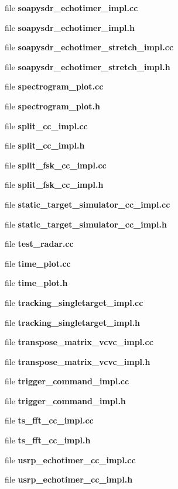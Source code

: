 \begin{DoxyCompactItemize}
\item 
file {\bf soapysdr\+\_\+echotimer\+\_\+impl.\+cc}
\item 
file {\bf soapysdr\+\_\+echotimer\+\_\+impl.\+h}
\item 
file {\bf soapysdr\+\_\+echotimer\+\_\+stretch\+\_\+impl.\+cc}
\item 
file {\bf soapysdr\+\_\+echotimer\+\_\+stretch\+\_\+impl.\+h}
\item 
file {\bf spectrogram\+\_\+plot.\+cc}
\item 
file {\bf spectrogram\+\_\+plot.\+h}
\item 
file {\bf split\+\_\+cc\+\_\+impl.\+cc}
\item 
file {\bf split\+\_\+cc\+\_\+impl.\+h}
\item 
file {\bf split\+\_\+fsk\+\_\+cc\+\_\+impl.\+cc}
\item 
file {\bf split\+\_\+fsk\+\_\+cc\+\_\+impl.\+h}
\item 
file {\bf static\+\_\+target\+\_\+simulator\+\_\+cc\+\_\+impl.\+cc}
\item 
file {\bf static\+\_\+target\+\_\+simulator\+\_\+cc\+\_\+impl.\+h}
\item 
file {\bf test\+\_\+radar.\+cc}
\item 
file {\bf time\+\_\+plot.\+cc}
\item 
file {\bf time\+\_\+plot.\+h}
\item 
file {\bf tracking\+\_\+singletarget\+\_\+impl.\+cc}
\item 
file {\bf tracking\+\_\+singletarget\+\_\+impl.\+h}
\item 
file {\bf transpose\+\_\+matrix\+\_\+vcvc\+\_\+impl.\+cc}
\item 
file {\bf transpose\+\_\+matrix\+\_\+vcvc\+\_\+impl.\+h}
\item 
file {\bf trigger\+\_\+command\+\_\+impl.\+cc}
\item 
file {\bf trigger\+\_\+command\+\_\+impl.\+h}
\item 
file {\bf ts\+\_\+fft\+\_\+cc\+\_\+impl.\+cc}
\item 
file {\bf ts\+\_\+fft\+\_\+cc\+\_\+impl.\+h}
\item 
file {\bf usrp\+\_\+echotimer\+\_\+cc\+\_\+impl.\+cc}
\item 
file {\bf usrp\+\_\+echotimer\+\_\+cc\+\_\+impl.\+h}
\end{DoxyCompactItemize}
